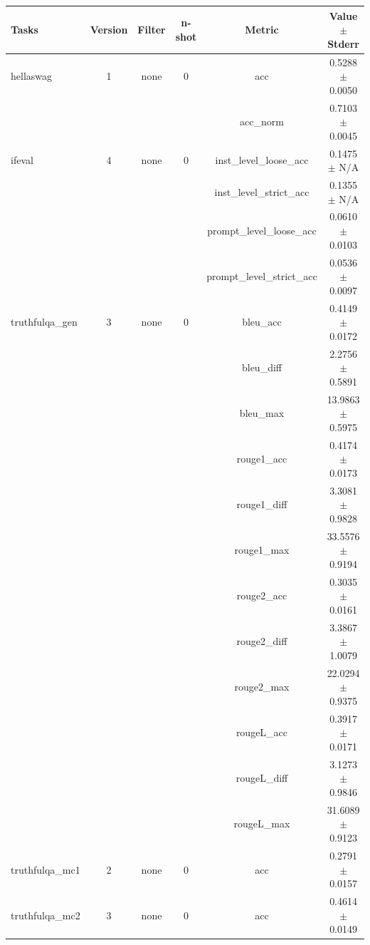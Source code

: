 \documentclass{ifacconf}
\begin{document}
\begin{strip}
\begin{minipage}{\textwidth}
			\begin{table}[H]
				\centering
				\begin{tabular}{|l|c|c|c|c|c|}
					\hline
					\textbf{Tasks} & \textbf{Version} & \textbf{Filter} & \textbf{n-shot} & \textbf{Metric} & \textbf{Value} $\pm$ \textbf{Stderr} \\ \hline
					hellaswag & 1 & none & 0 & acc & 0.5288 $\pm$ 0.0050 \\ \hline
					& & & & acc\_norm & 0.7103 $\pm$ 0.0045 \\ \hline
					ifeval & 4 & none & 0 & inst\_level\_loose\_acc & 0.1475 $\pm$ N/A \\ \hline
					& & & & inst\_level\_strict\_acc & 0.1355 $\pm$ N/A \\ \hline
					& & & & prompt\_level\_loose\_acc & 0.0610 $\pm$ 0.0103 \\ \hline
					& & & & prompt\_level\_strict\_acc & 0.0536 $\pm$ 0.0097 \\ \hline
					truthfulqa\_gen & 3 & none & 0 & bleu\_acc & 0.4149 $\pm$ 0.0172 \\ \hline
					& & & & bleu\_diff & 2.2756 $\pm$ 0.5891 \\ \hline
					& & & & bleu\_max & 13.9863 $\pm$ 0.5975 \\ \hline
					& & & & rouge1\_acc & 0.4174 $\pm$ 0.0173 \\ \hline
					& & & & rouge1\_diff & 3.3081 $\pm$ 0.9828 \\ \hline
					& & & & rouge1\_max & 33.5576 $\pm$ 0.9194 \\ \hline
					& & & & rouge2\_acc & 0.3035 $\pm$ 0.0161 \\ \hline
					& & & & rouge2\_diff & 3.3867 $\pm$ 1.0079 \\ \hline
					& & & & rouge2\_max & 22.0294 $\pm$ 0.9375 \\ \hline
					& & & & rougeL\_acc & 0.3917 $\pm$ 0.0171 \\ \hline
					& & & & rougeL\_diff & 3.1273 $\pm$ 0.9846 \\ \hline
					& & & & rougeL\_max & 31.6089 $\pm$ 0.9123 \\ \hline
					truthfulqa\_mc1 & 2 & none & 0 & acc & 0.2791 $\pm$ 0.0157 \\ \hline
					truthfulqa\_mc2 & 3 & none & 0 & acc & 0.4614 $\pm$ 0.0149 \\ \hline
				\end{tabular}
				\label{tab:llama31_pruned}
			\end{table}
			

\end{minipage}
\end{strip}
\end{document}
